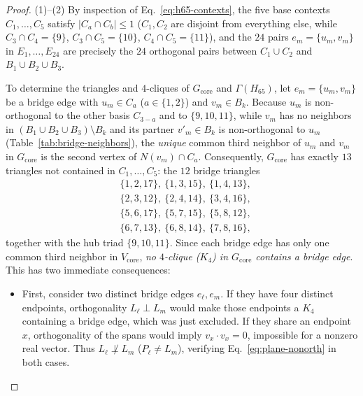 \documentclass[
  aps,
  pra,
  reprint,
  superscriptaddress,
  amsmath,
  amssymb,
  nofootinbib,
  floatfix
]{revtex4-2}
\theoremstyle{definition}
\theoremstyle{remark}
\begin{document}
\begin{proof}
(1)--(2) By inspection of Eq.~\eqref{eq:h65-contexts}, the five base contexts $C_1,\ldots,C_5$ satisfy $|C_a\cap C_b|\le1$ ($C_1,C_2$ are disjoint from everything else, while $C_3\cap C_4=\{9\}$, $C_3\cap C_5=\{10\}$, $C_4\cap C_5=\{11\}$), and the $24$ pairs $e_m=\{u_m,v_m\}$ in $E_1,\ldots,E_{24}$ are precisely the $24$ orthogonal pairs between $C_1\cup C_2$ and $B_1\cup B_2\cup B_3$.

To determine the triangles and $4$-cliques of $G_{\mathrm{core}}$ and $\Gamma(H_{65})$, let $e_m=\{u_m,v_m\}$ be a bridge edge with $u_m\in C_a$ ($a\in\{1,2\}$) and $v_m\in B_k$. Because $u_m$ is non-orthogonal to the other basis $C_{3-a}$ and to $\{9,10,11\}$, while $v_m$ has no neighbors in $(B_1\cup B_2\cup B_3)\setminus B_k$ and its partner $v'_m\in B_k$ is non-orthogonal to $u_m$ (Table~\ref{tab:bridge-neighbors}), the \emph{unique} common third neighbor of $u_m$ and $v_m$ in $G_{\mathrm{core}}$ is the second vertex of $N(v_m)\cap C_a$. Consequently, $G_{\mathrm{core}}$ has exactly $13$ triangles not contained in $C_1,\ldots,C_5$: the $12$ bridge triangles
\begin{align*}
&\{1,2,17\},\ \{1,3,15\},\ \{1,4,13\},\\
&\{2,3,12\},\ \{2,4,14\},\ \{3,4,16\},\\
&\{5,6,17\},\ \{5,7,15\},\ \{5,8,12\},\\
&\{6,7,13\},\ \{6,8,14\},\ \{7,8,16\},
\end{align*}
together with the hub triad $\{9,10,11\}$. Since each bridge edge has only one common third neighbor in $V_{\mathrm{core}}$, \emph{no $4$-clique ($K_4$) in $G_{\mathrm{core}}$ contains a bridge edge}. This has two immediate consequences:
\begin{itemize}
\item First, consider two distinct bridge edges $e_\ell,e_m$. If they have four distinct endpoints, orthogonality $L_\ell\perp L_m$ would make those endpoints a $K_4$ containing a bridge edge, which was just excluded. If they share an endpoint $x$, orthogonality of the spans would imply $v_x\cdot v_x=0$, impossible for a nonzero real vector. Thus $L_\ell\not\perp L_m$ ($P_\ell\ne L_m$), verifying Eq.~\eqref{eq:plane-nonorth} in both cases.


\end{itemize}
\end{proof}
\end{document}
